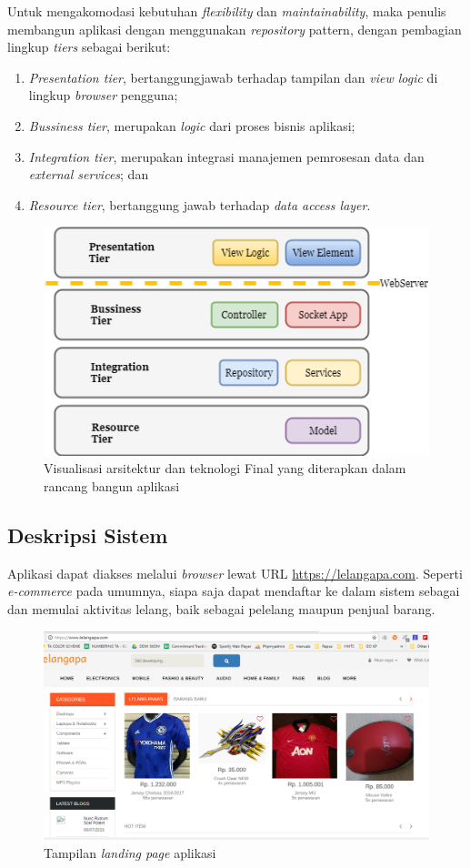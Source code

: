 		
		Untuk mengakomodasi kebutuhan \textit{flexibility} dan \textit{maintainability}, maka penulis membangun aplikasi dengan menggunakan \textit{repository} pattern, dengan pembagian lingkup \textit{tiers} sebagai berikut:
		\begin{enumerate}
			\item \textit{Presentation tier}, bertanggungjawab terhadap tampilan dan \textit{view logic} di lingkup \textit{browser} pengguna;
			\item \textit{Bussiness tier}, merupakan \textit{logic} dari proses bisnis aplikasi;
			\item \textit{Integration tier}, merupakan integrasi manajemen pemrosesan data dan \textit{external services}; dan
			\item \textit{Resource tier}, bertanggung jawab terhadap \textit{data access layer}.
		\end{enumerate}
		\begin{figure}[H]
			\centering
			\includegraphics[width=.4\textwidth]{images/bab3/apl/main-apl.png}
			\caption{Visualisasi arsitektur dan teknologi Final yang diterapkan dalam rancang bangun aplikasi}
			\label{tiers}
		\end{figure}
\subsection{Deskripsi Sistem}
Aplikasi dapat diakses melalui \textit{browser} lewat URL {\url{https://lelangapa.com}}. Seperti \textit{e-commerce} pada umumnya, siapa saja dapat mendaftar ke dalam sistem sebagai dan memulai aktivitas lelang, baik sebagai pelelang maupun penjual barang.
\begin{figure}[H]
	\centering
	\includegraphics[width=.45\textwidth]{images/UI/landing.png}
	\caption{Tampilan \textit{landing page} aplikasi}
	\label{snap-landing}
\end{figure}
